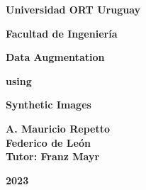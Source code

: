 \vspace*{\fill}

\begin{center}

\begin{Large}
\textbf{Universidad ORT Uruguay}

\textbf{Facultad de Ingeniería}
\vspace*{\fill}
\end{Large}

\begin{center}
\begin{huge}
\textbf{Data Augmentation}
\end{huge}
\end{center}
\begin{center}
\begin{huge}
\textbf{using}
\end{huge}
\end{center}
\begin{center}
\begin{huge}
\textbf{Synthetic Images}
\end{huge}
\vspace*{\fill}
\end{center}


\begin{Large}
\end{Large}
\vspace*{\fill}

\begin{Large}
\textbf{A. Mauricio Repetto} \\
\textbf{Federico de León} \\
\bigskip
\bigskip
\bigskip
\textbf{Tutor: Franz Mayr}
\vspace*{\fill}
\end{Large}

\begin{huge}
\textbf{2023}%
\end{huge}

\end{center}
\vspace*{\fill}
